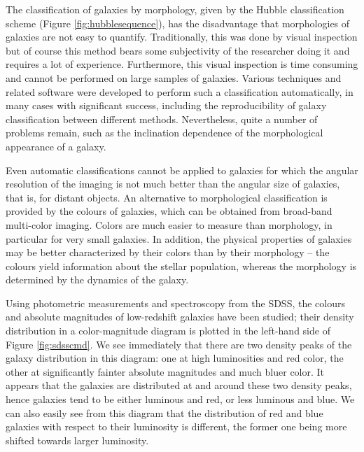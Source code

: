 \documentclass[a4paper,11pt]{article}
\begin{document}
{\noindent}The classification of galaxies by morphology, given by the Hubble classification scheme (Figure \ref{fig:hubblesequence}), has the disadvantage that morphologies of galaxies are not easy to quantify. Traditionally, this was done by visual inspection but of course this method bears some subjectivity of the researcher doing it and requires a lot of experience. Furthermore, this visual inspection is time consuming and cannot be performed on large samples of galaxies. Various techniques and related software were developed to perform such a classification automatically, in many cases with significant success, including the reproducibility of galaxy classification between different methods. Nevertheless, quite a number of problems remain, such as the inclination dependence of the morphological appearance of a galaxy.

{\noindent}Even automatic classifications cannot be applied to galaxies for which the angular resolution of the imaging is not much better than the angular size of galaxies, that is, for distant objects. An alternative to morphological classification is provided by the colours of galaxies, which can be obtained from broad-band multi-color imaging. Colors are much easier to measure than morphology, in particular for very small galaxies. In addition, the physical properties of galaxies may be better characterized by their colors than by their morphology -- the colours yield information about the stellar population, whereas the morphology is determined by the dynamics of the galaxy.

{\noindent}Using photometric measurements and spectroscopy from the SDSS, the colours and absolute magnitudes of low-redshift galaxies have been studied; their density distribution in a color-magnitude diagram is plotted in the left-hand side of Figure \ref{fig:sdsscmd}. We see immediately that there are two density peaks of the galaxy distribution in this diagram: one at high luminosities and red color, the other at significantly fainter absolute magnitudes and much bluer color. It appears that the galaxies are distributed at and around these two density peaks, hence galaxies tend to be either luminous and red, or less luminous and blue. We can also easily see from this diagram that the distribution of red and blue galaxies with respect to their luminosity is different, the former one being more shifted towards larger luminosity.
\end{document}
